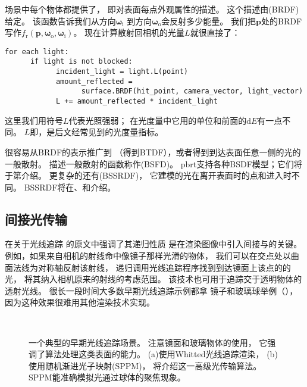 场景中每个物体都提供了，
即对表面每点外观属性的描述。
这个描述由(BRDF)给定。
该函数告诉我们从方向${\bm \omega}_\mathrm{i}$
到方向${\bm \omega}_\mathrm{o}$会反射多少能量。
我们把$\bm p$处的BRDF写作$f_{\mathrm{r}}({\bm p},{\bm \omega}_\mathrm{o},{\bm \omega}_\mathrm{i})$。
现在计算散射回相机的光量$L$就很直接了：
\begin{lstlisting}
for each light:
      if light is not blocked:
            incident_light = light.L(point)
            amount_reflected =
                  surface.BRDF(hit_point, camera_vector, light_vector)
            L += amount_reflected * incident_light
\end{lstlisting}
这里我们用符号$L$代表光照强弱；
在光度量中它用的单位和前面的$\mathrm{d}E$有一点不同。
$L$即，是后文经常见到的光度量指标。

很容易从BRDF的表示推广到
（得到BTDF），或者得到到达表面任意一侧的光的一般散射。
描述一般散射的函数称作(BSFD)。
pbrt支持各种BSDF模型；它们将于第介绍。
更复杂的还有(BSSRDF)，
它建模的光在离开表面时的点和进入时不同。
BSSRDF将在、和介绍。

\subsection{间接光传输}\label{sub:间接光传输}

\citet{10.1145/358876.358882}在关于光线追踪
的原文中强调了其递归性质
是在渲染图像中引入间接与的关键。
例如，如果来自相机的射线命中像镜子那样光滑的物体，
我们可以在交点处以曲面法线为对称轴反射该射线，
递归调用光线追踪程序找到到达镜面上该点的的光，
将其纳入相机原来的射线的考虑范围。
该技术也可用于追踪交于透明物体的透射光线。
很长一段时间大多数早期光线追踪示例都拿
镜子和玻璃球举例（），
因为这种效果很难用其他渲染技术实现。
\begin{figure}[htbp]
      \centering
      \\
      \caption{一个典型的早期光线追踪场景。
            注意镜面和玻璃物体的使用，
            它强调了算法处理这类表面的能力。
            (a)使用Whitted光线追踪渲染，
            (b)使用随机渐进光子映射(SPPM)，
            将介绍这一高级光传输算法。
            SPPM能准确模拟光通过球体的聚焦现象。}\label{fig:1.7}
\end{figure}

